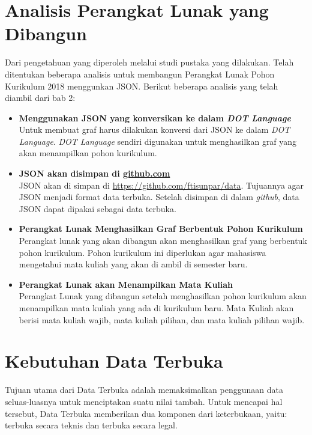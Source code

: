 \section{Analisis Perangkat Lunak yang Dibangun}
\label{sec: Analisis Perangkat Lunak yang Dibangun}
Dari pengetahuan yang diperoleh melalui studi pustaka yang dilakukan. Telah ditentukan beberapa analisis untuk membangun Perangkat Lunak Pohon Kurikulum 2018 menggunkan JSON. Berikut beberapa analisis yang telah diambil dari bab 2: 
\begin{itemize}
\item \textbf{Menggunakan JSON yang konversikan ke dalam \textit{DOT Language}}\\
Untuk membuat graf harus dilakukan konversi dari JSON ke dalam \textit{DOT Language}. \textit{DOT Language} sendiri digunakan untuk menghasilkan graf yang akan menampilkan pohon kurikulum. 

\item \textbf{JSON akan disimpan di \url{github.com}}\\
JSON akan di simpan di \url{https://github.com/ftisunpar/data}. Tujuannya agar JSON menjadi format data terbuka. Setelah disimpan di dalam \textit{github}, data JSON dapat dipakai sebagai data terbuka.

\item \textbf{Perangkat Lunak Menghasilkan Graf Berbentuk Pohon Kurikulum}\\
Perangkat lunak yang akan dibangun akan menghasilkan graf yang berbentuk pohon kurikulum. Pohon kurikulum ini diperlukan agar mahasiswa mengetahui mata kuliah yang akan di ambil di semester baru. 

\item \textbf{Perangkat Lunak akan Menampilkan Mata Kuliah}\\
Perangkat Lunak yang dibangun setelah menghasilkan pohon kurikulum akan menampilkan mata kuliah yang ada di kurikulum baru. Mata Kuliah akan berisi mata kuliah wajib, mata kuliah pilihan, dan mata kuliah pilihan wajib.
\end{itemize}

\section{Kebutuhan Data Terbuka}
\label{sec: Kebutuhan Data Terbuka}

Tujuan utama dari Data Terbuka adalah memaksimalkan penggunaan data seluas-luasnya untuk menciptakan suatu nilai tambah. Untuk mencapai hal tersebut, Data Terbuka memberikan dua komponen dari keterbukaan, yaitu: terbuka secara teknis dan terbuka secara legal. 

